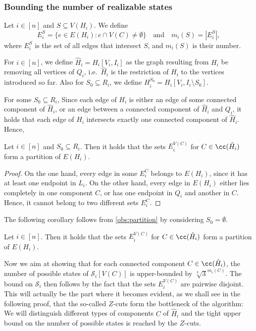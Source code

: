\documentclass[a4paper,UKenglish,cleveref, autoref, thm-restate]{lipics-v2021}
\begin{document}
\subsubsection*{Bounding the number of realizable states}

\begin{definition}
    Let $i\in[n]$ and $S\subseteq V(H_i)$. We define
    \[
    E_i^S = \{e\in E(H_i)\colon e\cap V(C) \neq \emptyset\}
    \quad\text{and}\quad
    m_i(S) = |E_i^S|,
    \]
    where $E_i^S$ is the set of all edges that intersect $S$, and $m_i(S)$ is their number.

    For $i\in[n]$, we define $\hat{H}_i = H_i[V_i, I_i]$ as the graph resulting from $H_i$ be removing all vertices of $Q_i$, i.e.\ $\hat{H}_i$ is the restriction of $H_i$ to the vertices introduced so far. Also for $S_0\subseteq R_i$, we define $H_i^{S_0} = H_i[V_i, I_i\setminus S_0]$.
\end{definition}

For some $S_0\subseteq R_i$, 
Since each edge of $H_i$ is either an edge of some connected component of $\hat{H}_i$, or an edge between a connected component of $\hat{H}_i$ and $Q_i$, it holds that each edge of $H_i$ intersects exactly one connected component of $\hat{H}_i$. Hence,

\begin{lemma}\label{obs:partition}
    Let $i\in[n]$ and $S_0\subseteq R_i$. Then it holds that the sets $E_i^{V(C)}$ for $C \in \cc(\hat{H}_i)$ form a partition of $E(H_i)$.
\end{lemma}

\begin{proof}
    On the one hand, every edge in some $E_i^C$ belongs to $E(H_i)$, since it has at least one endpoint in $L_i$.
    On the other hand, every edge in $E(H_i)$ either lies completely in one component $C$, or has one endpoint in $Q_i$ and another in $C$. Hence, it cannot belong to two different sets $E_i^C$.
\end{proof}

The following corollary follows from \cref{obs:partition} by considering $S_0 = \emptyset$.

\begin{corollary}\label{cor:partition}
    Let $i\in[n]$. Then it holds that the sets $E_i^{V(C)}$ for $C \in \cc(\hat{H}_i)$ form a partition of $E(H_i)$.
\end{corollary}


Now we aim at showing that for each connected component $C\in\cc(\hat{H}_i)$, the number of possible states of $\mathcal{S}_i[V(C)]$ is upper-bounded by $\sqrt[3]{3}^{m_i(C)}$. The bound on $\mathcal{S}_i$ then follows by the fact that the sets $E_i^{V(C)}$ are pairwise disjoint. This will actually be the part where it becomes evident, as we shall see in the following proof, that the so-called $Z$-cuts form the bottleneck of the algorithm: 
We will distinguish different types of components $C$ of $\hat{H}_i$ and the tight upper bound on the number of possible states is reached by the $Z$-cuts. 
\end{document}
